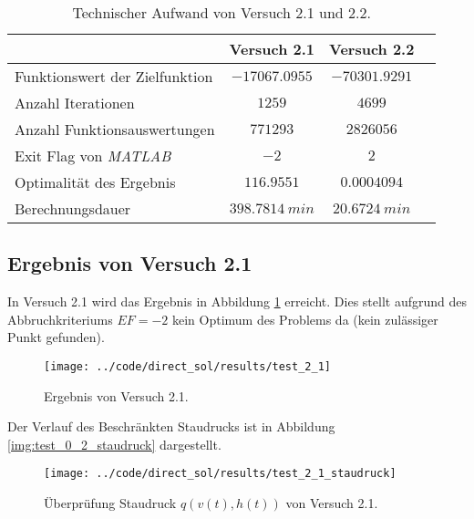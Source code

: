 \begin{table}[H]
    \centering
    \caption{Technischer Aufwand von Versuch 2.1 und 2.2.}\label{tab:Versuch2_TA}
    \begin{tabularx}{.9\textwidth}{Zccc}
        \toprule
         & \textbf{Versuch 2.1} & \textbf{Versuch 2.2} \\
        \midrule
        Funktionswert der Zielfunktion & $-17067.0955$ & $-70301.9291$ \\
        Anzahl Iterationen & $1259$ & $4699$ \\
        Anzahl Funktionsauswertungen & $771293$ & $2826056$ \\
        Exit Flag von \textit{MATLAB} & $-2$ & $2$ \\
        Optimalität des Ergebnis & $116.9551$ & $0.0004094$ \\
        Berechnungsdauer & $398.7814 \ min$ & $20.6724 \ min$ \\
        \bottomrule
    \end{tabularx}
\end{table}




\subsection{Ergebnis von Versuch 2.1}\label{kap:Versuch21}
In Versuch 2.1 wird das Ergebnis in Abbildung \ref{img:test_2_1} erreicht. Dies stellt aufgrund des Abbruchkriteriums $EF = -2$ kein Optimum des Problems da (kein zulässiger Punkt gefunden).
\begin{figure}[H]
\begin{center}
\texttt{[image: ../code/direct\_sol/results/test\_2\_1]}
\caption{Ergebnis von Versuch 2.1.}\label{img:test_2_1}
\end{center}
\end{figure}
Der Verlauf des Beschränkten Staudrucks ist in Abbildung \ref{img:test_0_2_staudruck} dargestellt.
\begin{figure}[H]
\begin{center}
\texttt{[image: ../code/direct\_sol/results/test\_2\_1\_staudruck]}
\caption{Überprüfung Staudruck $q(v(t),h(t))$ von Versuch 2.1.}\label{img:test_2_1_staudruck}
\end{center}
\end{figure}




